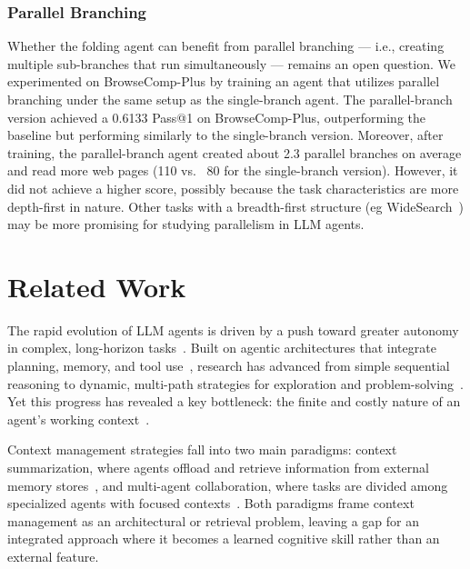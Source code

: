 \subsubsection{Parallel Branching}
Whether the folding agent can benefit from parallel branching — i.e., creating multiple sub-branches that run simultaneously — remains an open question.
We experimented on BrowseComp-Plus by training an agent that utilizes parallel branching under the same setup as the single-branch agent.
The parallel-branch version achieved a 0.6133 Pass@1 on BrowseComp-Plus, outperforming the baseline but performing similarly to the single-branch version.
Moreover, after training, the parallel-branch agent created about 2.3 parallel branches on average and read more web pages (110 vs. ~80 for the single-branch version).
However, it did not achieve a higher score, possibly because the task characteristics are more depth-first in nature. Other tasks with a breadth-first structure (eg WideSearch~\citep{Wong2025WideSearchBA}) may be more promising for studying parallelism in LLM agents.


\section{Related Work}
The rapid evolution of LLM agents is driven by a push toward greater autonomy in complex, long-horizon tasks~\citep{Jimenez2023SWEbenchCL,openai2025chatgptAgent,Zhou2023WebArenaAR,METR2025a,Li2025TowardsCA}. Built on agentic architectures that integrate planning, memory, and tool use~\citep{Wang2023ASO}, research has advanced from simple sequential reasoning to dynamic, multi-path strategies for exploration and problem-solving~\citep{Yao2023TreeOT,Besta2023GraphOT,Huang2022LanguageMA,Sun2025COBenchBL}. Yet this progress has revealed a key bottleneck: the finite and costly nature of an agent’s working context~\citep{Yao2022ReAct,OpenHands2025}.

Context management strategies fall into two main paradigms: context summarization, where agents offload and retrieve information from external memory stores~\citep{Wang2023VoyagerAO,Tang2025AgentKL,Yu2025MemAgentRL,Wu2025ReSumUL,Zhou2025MEM1LT}, and multi-agent collaboration, where tasks are divided among specialized agents with focused contexts~\citep{Zhao2024LongAgentSL,Zhang2024ChainOA,Anthropic2025c,Wong2025WideSearchBA}.
Both paradigms frame context management as an architectural or retrieval problem, leaving a gap for an integrated approach where it becomes a learned cognitive skill rather than an external feature.

